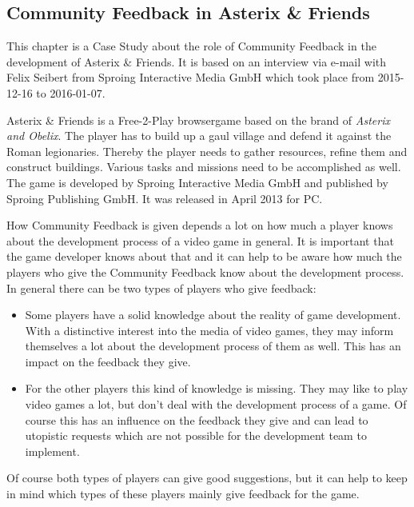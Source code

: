 \subsection{Community Feedback in Asterix \& Friends}
\label{subsec:communityFeedbackInAsterixAndFriends}
This chapter is a Case Study about the role of Community Feedback in the development of Asterix \& Friends. It is based on an interview via e-mail with Felix Seibert from Sproing Interactive Media GmbH which took place from 2015-12-16 to 2016-01-07.

Asterix \& Friends is a Free-2-Play browsergame based on the brand of \textit{Asterix and Obelix}. The player has to build up a gaul village and defend it against the Roman legionaries. Thereby the player needs to gather resources, refine them and construct buildings. Various tasks and missions need to be accomplished as well.\citep{asterix_faq_2014} The game is developed by Sproing Interactive Media GmbH and published by Sproing Publishing GmbH. It was released in April 2013 for PC.\citep{asterix_sproing_2015}

How Community Feedback is given depends a lot on how much a player knows about the development process of a video game in general. It is important that the game developer knows about that and it can help to be aware how much the players who give the Community Feedback know about the development process. In general there can be two types of players who give feedback:\citep{seibert_interview_2016}

\begin{itemize}
    \item Some players have a solid knowledge about the reality of game development. With a distinctive interest into the media of video games, they may inform themselves a lot about the development process of them as well. This has an impact on the feedback they give.
    
    \item For the other players this kind of knowledge is missing. They may like to play video games a lot, but don't deal with the development process of a game. Of course this has an influence on the feedback they give and can lead to utopistic requests which are not possible for the development team to implement.
\end{itemize}

Of course both types of players can give good suggestions, but it can help to keep in mind which types of these players mainly give feedback for the game.\citep{seibert_interview_2016}

